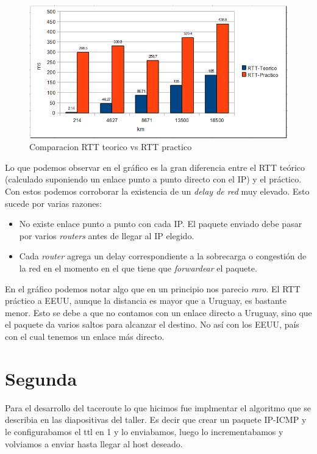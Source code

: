 \documentclass[a4paper]{article}
\begin{document}
\begin{figure}[H]
  \centering
  \includegraphics[scale=0.60]{graficos/comparacionRTT.png}
  \caption{Comparacion RTT teorico vs RTT practico }
\end{figure}


Lo que podemos observar en el gráfico es la gran diferencia entre el RTT teórico (calculado suponiendo un enlace punto a punto directo con el IP) y el práctico. Con estos podemos corroborar la existencia de un \textit{delay de red} muy elevado. Esto sucede por varias razones:
\begin{itemize}
	\item No existe enlace punto a punto con cada IP. El paquete enviado debe pasar por varios \textit{routers} antes de llegar al IP elegido.
	\item Cada \textit{router} agrega un delay correspondiente a la sobrecarga o congestión de la red en el momento en el que tiene que \textit{forwardear} el paquete. 
\end{itemize}

En el gráfico podemos notar algo que en un principio nos parecio \textit{raro}. El RTT práctico a EEUU, aunque la distancia es mayor que a Uruguay, es bastante menor. Esto se debe a que no contamos con un enlace directo a Uruguay, sino que el paquete da varios saltos para alcanzar el destino. No así con los EEUU, país con el cual tenemos un enlace más directo.  


\newpage
\section{Segunda}

 Para el desarrollo del taceroute lo que hicimos fue implmentar el algoritmo que se describia en las
 diapositivas del taller.
 Es decir que crear un paquete IP-ICMP y le configurabamos el ttl en 1 y lo enviabamos, luego lo 
 incrementabamos y volviamos a enviar hasta llegar al host deseado.
 
\end{document}

